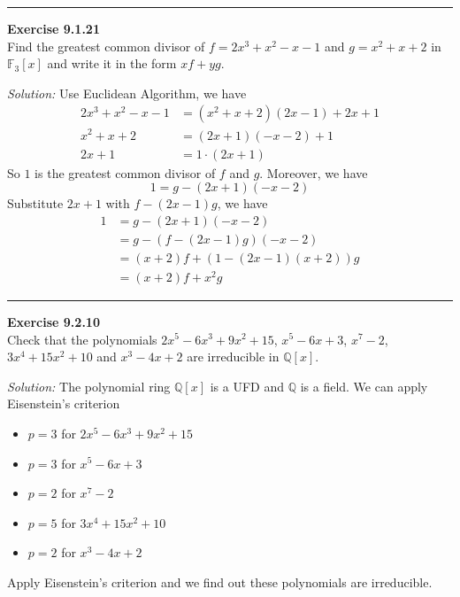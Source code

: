 \documentclass[a4paper, 12pt]{article}
\newenvironment{problem}[2][Exercise]
    { \begin{mdframed}[backgroundcolor=gray!20] \textbf{#1 #2} \\}
    {  \end{mdframed}}
\newenvironment{solution}
    {\textit{Solution:}}
    {}
\begin{document}
\noindent\rule{7in}{2.8pt}
\begin{problem}{9.1.21}
Find the greatest common divisor of \(f=2x^3+x^2-x-1\) and \(g=x^2+x+2\) in \(\mathbb{F}_3[x]\) and write it in the form \(xf+yg\).
\end{problem}
\begin{solution}
Use Euclidean Algorithm, we have 
\begin{align*}
	2x^3+x^2-x-1&=(x^2+x+2)(2x-1)+2x+1\\
	x^2+x+2&=(2x+1)(-x-2)+1\\ 
    2x+1&=1\cdot (2x+1)
\end{align*}
So \(1\) is the greatest common divisor of \(f\) and \(g\). Moreover, we have 
\[1=g-(2x+1)(-x-2)\]
Substitute \(2x+1\) with \(f-(2x-1)g\), we have 
\begin{align*}
	1&=g-(2x+1)(-x-2)\\ 
	 &=g-(f-(2x-1)g)(-x-2)\\ 
	 &=(x+2)f+(1-(2x-1)(x+2))g\\ 
	 &=(x+2)f+x^2g
\end{align*}
\end{solution}

\noindent\rule{7in}{2.8pt}
\begin{problem}{9.2.10}
Check that the polynomials \(2x^5-6x^3+9x^2+15\), \(x^5-6x+3\), \(x^7-2\), \(3x^4+15x^2+10\) and \(x^3-4x+2\) are irreducible in \(\mathbb{Q}[x]\).
\end{problem}
\begin{solution}
The polynomial ring \(\mathbb{Q}[x]\) is a UFD and \(\mathbb{Q}\) is a field. We can apply Eisenstein's criterion 
\begin{itemize}
\item \(p=3\) for \(2x^5-6x^3+9x^2+15\)
\item \(p=3\) for \(x^5-6x+3\) 
\item \(p=2\) for \(x^7-2\)
\item \(p=5\) for \(3x^4+15x^2+10\)
\item \(p=2\) for \(x^3-4x+2\)
\end{itemize}
Apply Eisenstein's criterion and we find out these polynomials are irreducible.
\end{solution}
\end{document}

